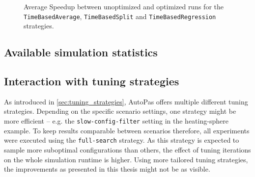 \begin{figure}[htpb]
	\centering
	\caption{Average Speedup between unoptimized and optimized runs for the \texttt{TimeBasedAverage}, \texttt{TimeBasedSplit} and \texttt{TimeBasedRegression} strategies.}
	\label{fig:optimization_speedup}
\end{figure}

\subsection{Available simulation statistics}

\subsection{Interaction with tuning strategies}
As introduced in \autoref{sec:tuning_strategies}, AutoPas offers multiple different tuning strategies. Depending on the specific scenario settings, one strategy might be more efficient -- e.g. the \texttt{slow-config-filter} setting in the heating-sphere example. To keep results comparable between scenarios therefore, all experiments were executed using the \texttt{full-search} strategy. As this strategy is expected to sample more suboptimal configurations than others, the effect of tuning iterations on the whole simulation runtime is higher. Using more tailored tuning strategies, the improvements as presented in this thesis might not be as visible.

